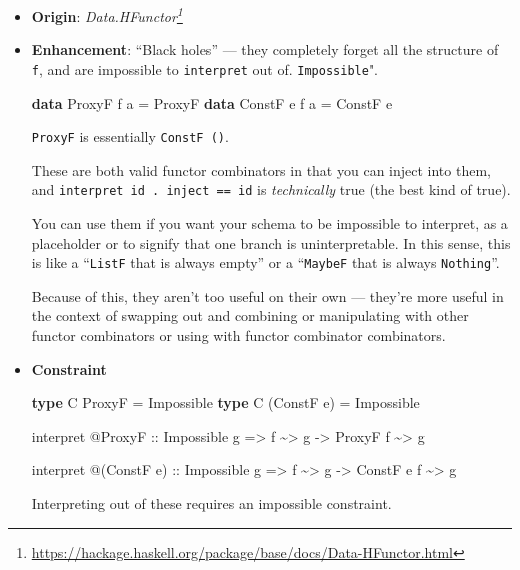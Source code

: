 \documentclass[]{article}
\newenvironment{Shaded}{}{}
\newcommand{\DataTypeTok}[1]{\textcolor[rgb]{0.56,0.13,0.00}{#1}}
\newcommand{\KeywordTok}[1]{\textcolor[rgb]{0.00,0.44,0.13}{\textbf{#1}}}
\newcommand{\NormalTok}[1]{#1}
\newcommand{\OperatorTok}[1]{\textcolor[rgb]{0.40,0.40,0.40}{#1}}
\newcommand{\OtherTok}[1]{\textcolor[rgb]{0.00,0.44,0.13}{#1}}
\renewcommand{\href}[2]{#2\footnote{\url{#1}}}
\begin{document}
\begin{itemize}
\item
  \textbf{Origin}:
  \emph{\href{https://hackage.haskell.org/package/base/docs/Data-HFunctor.html}{Data.HFunctor}}
\item
  \textbf{Enhancement}: ``Black holes'' --- they completely forget all the
  structure of \texttt{f}, and are impossible to \texttt{interpret} out of.
  \texttt{Impossible}".

\begin{Shaded}
\begin{Highlighting}[]
\KeywordTok{data} \DataTypeTok{ProxyF}\NormalTok{ f a }\OtherTok{=} \DataTypeTok{ProxyF}
\KeywordTok{data} \DataTypeTok{ConstF}\NormalTok{ e f a }\OtherTok{=} \DataTypeTok{ConstF}\NormalTok{ e}
\end{Highlighting}
\end{Shaded}

  \texttt{ProxyF} is essentially \texttt{ConstF\ ()}.

  These are both valid functor combinators in that you can inject into them, and
  \texttt{interpret\ id\ .\ inject\ ==\ id} is \emph{technically} true (the best
  kind of true).

  You can use them if you want your schema to be impossible to interpret, as a
  placeholder or to signify that one branch is uninterpretable. In this sense,
  this is like a ``\texttt{ListF} that is always empty'' or a ``\texttt{MaybeF}
  that is always \texttt{Nothing}''.

  Because of this, they aren't too useful on their own --- they're more useful
  in the context of swapping out and combining or manipulating with other
  functor combinators or using with functor combinator combinators.
\item
  \textbf{Constraint}

\begin{Shaded}
\begin{Highlighting}[]
\KeywordTok{type} \DataTypeTok{C} \DataTypeTok{ProxyF}     \OtherTok{=} \DataTypeTok{Impossible}
\KeywordTok{type} \DataTypeTok{C}\NormalTok{ (}\DataTypeTok{ConstF}\NormalTok{ e) }\OtherTok{=} \DataTypeTok{Impossible}

\NormalTok{interpret }\OperatorTok{@}\DataTypeTok{ProxyF}
\OtherTok{    ::} \DataTypeTok{Impossible}\NormalTok{ g}
    \OtherTok{=>}\NormalTok{ f }\OperatorTok{\textasciitilde{}>}\NormalTok{ g}
    \OtherTok{{-}>} \DataTypeTok{ProxyF}\NormalTok{ f }\OperatorTok{\textasciitilde{}>}\NormalTok{ g}

\NormalTok{interpret }\OperatorTok{@}\NormalTok{(}\DataTypeTok{ConstF}\NormalTok{ e)}
\OtherTok{    ::} \DataTypeTok{Impossible}\NormalTok{ g}
    \OtherTok{=>}\NormalTok{ f }\OperatorTok{\textasciitilde{}>}\NormalTok{ g}
    \OtherTok{{-}>} \DataTypeTok{ConstF}\NormalTok{ e f }\OperatorTok{\textasciitilde{}>}\NormalTok{ g}
\end{Highlighting}
\end{Shaded}

  Interpreting out of these requires an impossible constraint.
\end{itemize}
\end{document}
